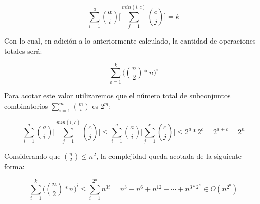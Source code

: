 \[
\sum_{i=1}^{a}\binom{a}{i}\bigg[\sum_{j=1}^{min(i,c)}\binom{c}{j}\bigg]=k
\]  

Con lo cual, en adición a lo anteriormente calculado, la cantidad de operaciones totales será:

 \[
 \sum_{i=1}^{k}\bigg(\binom{n}{2} \ast n\bigg)^i
 \]

Para acotar este valor utilizaremos que el número total de subconjuntos combinatorios $\sum_{i=1}^{m}\binom{m}{i}$ es $2^m$:

\[
\sum_{i=1}^{a}\binom{a}{i}\bigg[\sum_{j=1}^{min(i,c)}\binom{c}{j}\bigg] \leq \sum_{i=1}^{a}\binom{a}{i}\bigg[\sum_{j=1}^{c}\binom{c}{j}\bigg] \leq 2^a \ast 2^c = 2^{a+c} = 2^{n}
\]

Considerando que $\binom{n}{2} \leq n^2$, la complejidad queda acotada de la siguiente forma:

 \[
 \sum_{i=1}^{k}\bigg(\binom{n}{2} \ast n \bigg)^i \leq \sum_{i=1}^{2^{n}}n^{3i} = n^{3} + n^{6} + n^{12} + \cdots + n^{3 \ast 2^{n}} \in O(n^{2^{n}})
 \]





